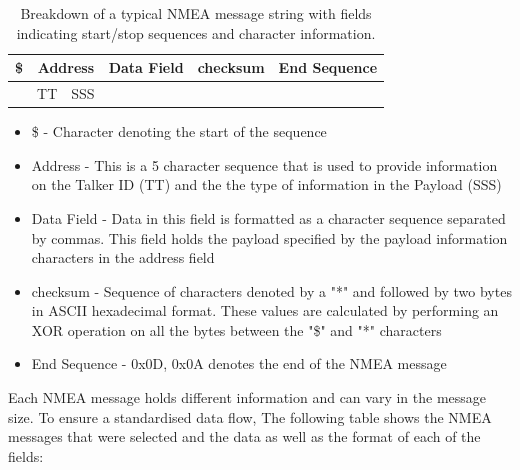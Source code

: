 \begin{table}[H]
    \centering
    \caption{ Breakdown of a typical NMEA message string with fields indicating start/stop sequences and character information.}
    \begin{tabular}{|c|c|c|c|c|c|}
    \hline
     \$    & \multicolumn{2}{|c|}{Address} & Data Field & checksum & End Sequence\\
     \hline
     \multicolumn{1}{c|}{} & TT & SSS &\multicolumn{3}{c}{} \\
      \cline{2-3}
    \end{tabular}

    \label{tab:GPS_data_format}
\end{table}
\begin{itemize}
    \item \$ - Character denoting the start of the sequence
    \item Address - This is a 5 character sequence that is used to provide information on the Talker ID (TT) and the the type of information in the Payload (SSS)
    \item Data Field - Data in this field is formatted as a character sequence separated by commas. This field holds the payload specified by the payload information characters in the address field
    \item checksum - Sequence of characters denoted by a "*" and followed by two bytes in ASCII hexadecimal format. These values are calculated by performing an XOR operation on all the bytes between the "\$" and "*" characters
    \item End Sequence - 0x0D, 0x0A denotes the end of the  NMEA message
\end{itemize}

Each NMEA message holds different information and can vary in the message size. To ensure a standardised data flow, The following table shows the NMEA messages that were selected and the data as well as the format of each of the fields:

